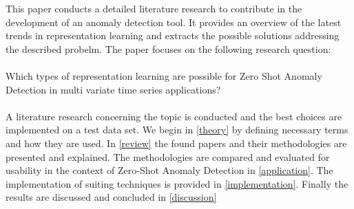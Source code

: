 This paper conducts a detailed literature research to contribute in the development of an anomaly detection tool. It provides an overview of the latest trends in representation learning and extracts the possible solutions addressing the described probelm. The paper focuses on the following research question:\\\\
Which types of representation learning are possible for Zero Shot Anomaly Detection in multi variate time series applications?\\\\
A literature research concerning the topic is conducted and the best choices are implemented on a test data set. We begin in \ref{theory} by defining necessary terms and how they are used. In \ref{review} the found papers and their methodologies are presented and explained. The methodologies are compared and evaluated for usability in the context of Zero-Shot Anomaly Detection in \ref{application}. The implementation of suiting techniques is provided in \ref{implementation}. Finally the results are discussed and concluded in \ref{discussion}
